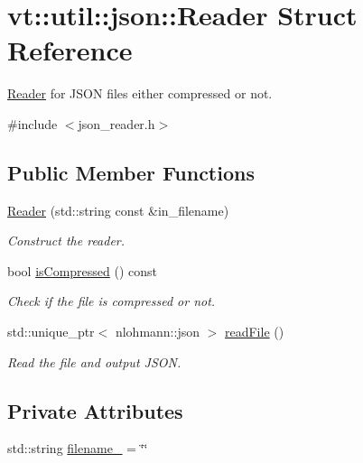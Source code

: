 \hypertarget{structvt_1_1util_1_1json_1_1_reader}{}\section{vt\+:\+:util\+:\+:json\+:\+:Reader Struct Reference}
\label{structvt_1_1util_1_1json_1_1_reader}


\hyperlink{structvt_1_1util_1_1json_1_1_reader}{Reader} for J\+S\+ON files either compressed or not.  




{\ttfamily \#include $<$json\+\_\+reader.\+h$>$}

\subsection*{Public Member Functions}
\begin{DoxyCompactItemize}
\item 
\hyperlink{structvt_1_1util_1_1json_1_1_reader_a144aa8a5e2d81ce335d9bce88afca096}{Reader} (std\+::string const \&in\+\_\+filename)
\begin{DoxyCompactList}\small\item\em Construct the reader. \end{DoxyCompactList}\item 
bool \hyperlink{structvt_1_1util_1_1json_1_1_reader_aaba62e5b17f0840092f13ea2b7edf554}{is\+Compressed} () const
\begin{DoxyCompactList}\small\item\em Check if the file is compressed or not. \end{DoxyCompactList}\item 
std\+::unique\+\_\+ptr$<$ nlohmann\+::json $>$ \hyperlink{structvt_1_1util_1_1json_1_1_reader_a908f4834ad9fc0d4428fcb1db53f8382}{read\+File} ()
\begin{DoxyCompactList}\small\item\em Read the file and output J\+S\+ON. \end{DoxyCompactList}\end{DoxyCompactItemize}
\subsection*{Private Attributes}
\begin{DoxyCompactItemize}
\item 
std\+::string \hyperlink{structvt_1_1util_1_1json_1_1_reader_a291e175a92898f3cb80c2f05f1350326}{filename\+\_\+} = \char`\"{}\char`\"{}
\end{DoxyCompactItemize}


